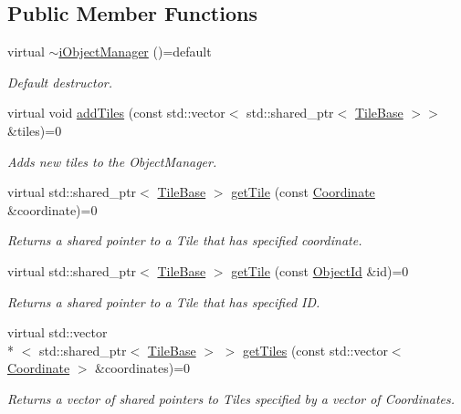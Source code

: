 \subsection*{Public Member Functions}
\begin{DoxyCompactItemize}
\item 
virtual \hyperlink{classCourse_1_1iObjectManager_afe7f4ca78e8bcb3d94f92cbcb3e36a6f}{$\sim$i\-Object\-Manager} ()=default
\begin{DoxyCompactList}\small\item\em Default destructor. \end{DoxyCompactList}\item 
virtual void \hyperlink{classCourse_1_1iObjectManager_a826fa55229bdc23c49f847245fbdda95}{add\-Tiles} (const std\-::vector$<$ std\-::shared\-\_\-ptr$<$ \hyperlink{classCourse_1_1TileBase}{Tile\-Base} $>$$>$ \&tiles)=0
\begin{DoxyCompactList}\small\item\em Adds new tiles to the Object\-Manager. \end{DoxyCompactList}\item 
virtual std\-::shared\-\_\-ptr$<$ \hyperlink{classCourse_1_1TileBase}{Tile\-Base} $>$ \hyperlink{classCourse_1_1iObjectManager_afd7ab74d8a4cfedd50340c1e9096672d}{get\-Tile} (const \hyperlink{classCourse_1_1Coordinate}{Coordinate} \&coordinate)=0
\begin{DoxyCompactList}\small\item\em Returns a shared pointer to a Tile that has specified coordinate. \end{DoxyCompactList}\item 
virtual std\-::shared\-\_\-ptr$<$ \hyperlink{classCourse_1_1TileBase}{Tile\-Base} $>$ \hyperlink{classCourse_1_1iObjectManager_a7c3280cc01c8cf77d49afe88ca0e6b48}{get\-Tile} (const \hyperlink{namespaceCourse_a9a16e743c9813da00109e4991afd2f3e}{Object\-Id} \&id)=0
\begin{DoxyCompactList}\small\item\em Returns a shared pointer to a Tile that has specified I\-D. \end{DoxyCompactList}\item 
virtual std\-::vector\\*
$<$ std\-::shared\-\_\-ptr$<$ \hyperlink{classCourse_1_1TileBase}{Tile\-Base} $>$ $>$ \hyperlink{classCourse_1_1iObjectManager_ac1b0d805db508f80477fbb7e5987e4e4}{get\-Tiles} (const std\-::vector$<$ \hyperlink{classCourse_1_1Coordinate}{Coordinate} $>$ \&coordinates)=0
\begin{DoxyCompactList}\small\item\em Returns a vector of shared pointers to Tiles specified by a vector of Coordinates. \end{DoxyCompactList}\end{DoxyCompactItemize}


